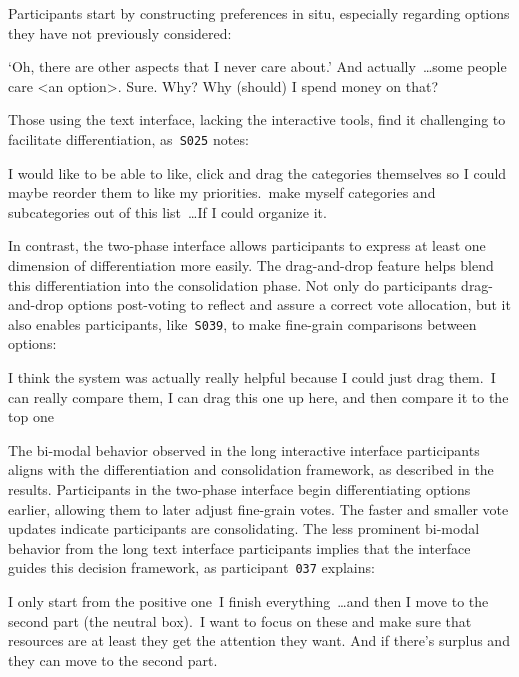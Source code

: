 Participants start by constructing preferences in situ, especially regarding options they have not previously considered:
\begin{displayquote}
    \bracketellipsis`Oh, there are other aspects that I never care about.' And actually~\ldots some people care <an option>. Sure. Why? Why (should) I spend money on that? \\\hfill{}
\end{displayquote}

Those using the text interface, lacking the interactive tools, find it challenging to facilitate differentiation, as~\texttt{S025} notes:

\begin{displayquote}
    I would like to be able to like, click and drag the categories themselves so I could maybe reorder them to like my priorities.~\bracketellipsis make myself categories and subcategories out of this list~\ldots If I could organize it. \hfill{}
\end{displayquote}

In contrast, the two-phase interface allows participants to express at least one dimension of differentiation more easily. The drag-and-drop feature helps blend this differentiation into the consolidation phase. Not only do participants drag-and-drop options post-voting to reflect and assure a correct vote allocation, but it also enables participants, like~\texttt{S039}, to make fine-grain comparisons between options:  

\begin{displayquote}  
    I think the system was actually really helpful because I could just drag them.~\bracketellipsis I can really compare them, I can drag this one up here, and then compare it to the top one~\bracketellipsis \hfill{}  
\end{displayquote}  

The bi-modal behavior observed in the long interactive interface participants aligns with the differentiation and consolidation framework, as described in the results. Participants in the two-phase interface begin differentiating options earlier, allowing them to later adjust fine-grain votes. The faster and smaller vote updates indicate participants are consolidating. The less prominent bi-modal behavior from the long text interface participants implies that the interface guides this decision framework, as participant~\texttt{037} explains:

\begin{displayquote}
    I only start from the positive one~\bracketellipsis I finish everything~\ldots and then I move to the second part (the neutral box).~\bracketellipsis I want to focus on these and make sure that resources are at least they get the attention they want. And if there's surplus and they can move to the second part. \hfill{}
\end{displayquote}

